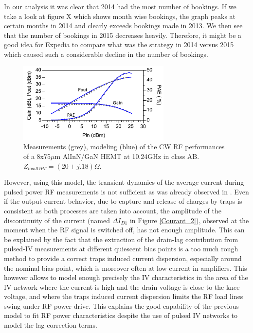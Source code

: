 \documentclass[conference]{IEEEtran}
\begin{document}
In our analysis it was clear that 2014 had the most number of bookings. If we take a look at figure X which shows month wise bookings, the graph peaks at certain months in 2014 and clearly exceeds bookings made in 2013. We then see that the number of bookings in 2015 decreases heavily. Therefore, it might be a good idea for Expedia to compare what was the strategy in 2014 versus 2015 which caused such a considerable decline in the number of bookings.



\begin{figure}[ht!] %
\centering
\includegraphics[width=3in]{FigureLP_ancien_mod.pdf}
\caption{Measurements (grey), modeling (blue) of the CW RF performances of a 8x75$\mu$m AlInN/GaN HEMT at 10.24GHz in class AB. $Z_{loadOPT} = (20+j.18) \Omega$.}
\label{LP}
\end{figure}

However, using this model, the transient dynamics of the average current during pulsed power RF measurements is not sufficient as was already observed in \cite{9257290}.
Even if the output current behavior, due to capture and release of charges by traps is consistent as both processes are taken into account, the amplitude of the discontinuity of the current (named $\Delta I_{D1}$ in Figure \ref{Courant_2}), observed at the moment when the RF signal is switched off, has not enough amplitude. This can be explained by the fact that the extraction of the drain-lag contribution from pulsed-IV measurements at different quiescent bias points is a too much rough method to provide a correct traps induced current dispersion, especially around the nominal bias point, which is moreover often at low current in amplifiers. This however allows to model enough precisely the IV characteristics in the area of the IV network where the current is high and the drain voltage is close to the knee voltage, and where the traps induced current dispersion limits the RF load lines swing under RF power drive. This explains the good capability of the previous model to fit RF power characteristics despite the use of pulsed IV networks to model the lag correction terms.
\end{document}
